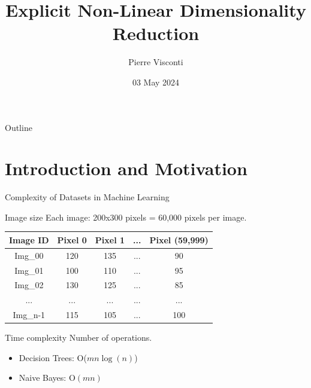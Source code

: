 \documentclass{beamer}
\title{Explicit Non-Linear Dimensionality Reduction}
\author{Pierre Visconti}
\institute{Department of Mathematics, Walla Walla University}
\date{03 May 2024}
\begin{document}
\begin{frame}	
\titlepage
\end{frame}

\begin{frame}{Outline}
	\tableofcontents
\end{frame}



\section[Introduction]{Introduction and Motivation}


\begin{frame}{Complexity of Datasets in Machine Learning}
        \begin{block}{Image size}
        Each image: 200x300 pixels = 60,000 pixels per image.
        \end{block}
        \begin{tabular}{|c|c|c|c|c|}
        \hline
        \textbf{Image ID} & \textbf{Pixel 0} & \textbf{Pixel 1} & \textbf{...} & \textbf{Pixel (59,999)} \\
        \hline
        Img\_00 & 120 & 135 & ... & 90 \\
        \hline
        Img\_01 & 100 & 110 & ... & 95 \\
        \hline
        Img\_02 & 130 & 125 & ... & 85 \\
        \hline
        ... & ... & ... & ... & ... \\
        \hline
        Img\_n-1 & 115 & 105 & ... & 100 \\
        \hline
        \end{tabular}
       \pause
        \begin{block}{Time complexity}
        Number of operations.
        \begin{itemize}
        \item Decision Trees: O($mn\log{(n)}$)
        \item Naive Bayes: $\text{O}(mn)$
        \end{itemize}
        \end{block}
\end{frame}
\end{document}
